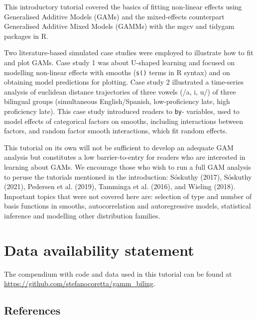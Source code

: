 \documentclass[
  letterpaper,
  DIV=11,
  numbers=noendperiod]{scrartcl}
\begin{document}
This introductory tutorial covered the basics of fitting non-linear
effects using Generalised Additive Models (GAMs) and the mixed-effects
counterpart Generalised Additive Mixed Models (GAMMs) with the mgcv and
tidygam packages in R.

Two literature-based simulated case studies were employed to illustrate
how to fit and plot GAMs. Case study 1 was about U-shaped learning and
focused on modelling non-linear effects with smooths (\texttt{s()} terms
in R syntax) and on obtaining model predictions for plotting. Case study
2 illustrated a time-series analysis of euclidean distance trajectories
of three vowels (/a, i, u/) of three bilingual groups (simultaneous
English/Spanish, low-proficiency late, high proficiency late). This case
study introduced readers to \texttt{by}- variables, used to model
effects of categorical factors on smooths, including interactions
between factors, and random factor smooth interactions, which fit random
effects.

This tutorial on its own will not be sufficient to develop an adequate
GAM analysis but constitutes a low barrier-to-entry for readers who are
interested in learning about GAMs. We encourage those who wish to run a
full GAM analysis to peruse the tutorials mentioned in the introduction:
Sóskuthy (2017), Sóskuthy (2021), Pedersen et al. (2019), Tamminga et
al. (2016), and Wieling (2018). Important topics that were not covered
here are: selection of type and number of basis functions in smooths,
autocorrelation and autoregressive models, statistical inference and
modelling other distribution families.

\section{Data availability statement}\label{data-availability-statement}

The compendium with code and data used in this tutorial can be found at
\url{https://github.com/stefanocoretta/gamm_biling}.

\newpage{}

\subsection*{References}\label{references}
\end{document}
